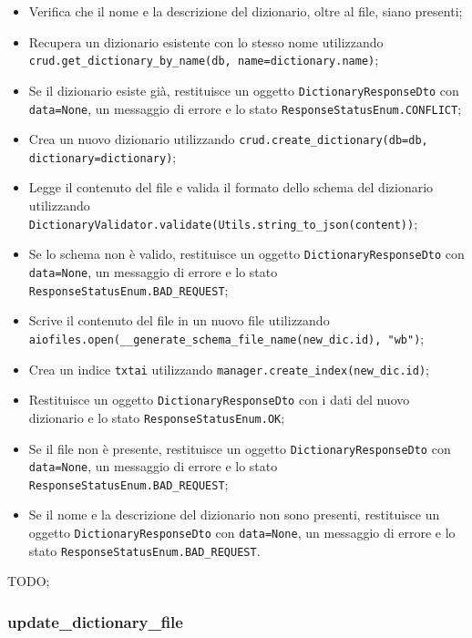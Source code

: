 \begin{itemize}
 \item Verifica che il nome e la descrizione del dizionario, oltre al file, siano presenti;
 \item Recupera un dizionario esistente con lo stesso nome utilizzando \texttt{crud.get\_dictionary\_by\_name(db, name=dictionary.name)};
 \item Se il dizionario esiste già, restituisce un oggetto \texttt{DictionaryResponseDto} con \texttt{data=None}, un messaggio di errore e lo stato \texttt{ResponseStatusEnum.CONFLICT};
 \item Crea un nuovo dizionario utilizzando \texttt{crud.create\_dictionary(db=db, dictionary=dictionary)};
 \item Legge il contenuto del file e valida il formato dello schema del dizionario utilizzando \texttt{DictionaryValidator.validate(Utils.string\_to\_json(content))};
 \item Se lo schema non è valido, restituisce un oggetto \texttt{DictionaryResponseDto} con \texttt{data=None}, un messaggio di errore e lo stato \texttt{ResponseStatusEnum.BAD\_REQUEST};
 \item Scrive il contenuto del file in un nuovo file utilizzando \texttt{aiofiles.open(\_\_generate\_schema\_file\_name(new\_dic.id), "wb")};
 \item Crea un indice \texttt{txtai} utilizzando \texttt{manager.create\_index(new\_dic.id)};
 \item Restituisce un oggetto \texttt{DictionaryResponseDto} con i dati del nuovo dizionario e lo stato \texttt{ResponseStatusEnum.OK};
 \item Se il file non è presente, restituisce un oggetto \texttt{DictionaryResponseDto} con \texttt{data=None}, un messaggio di errore e lo stato \texttt{ResponseStatusEnum.BAD\_REQUEST};
 \item Se il nome e la descrizione del dizionario non sono presenti, restituisce un oggetto \texttt{DictionaryResponseDto} con \texttt{data=None}, un messaggio di errore e lo stato \texttt{ResponseStatusEnum.BAD\_REQUEST}.
\end{itemize}

\par TODO;

\subsubsection{update\_dictionary\_file}

